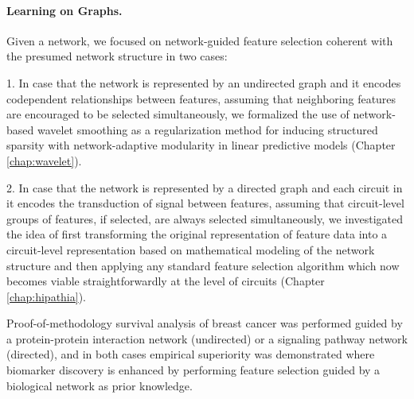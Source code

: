 \paragraph{Learning on Graphs.}

Given a network, we focused on network-guided feature selection coherent with the presumed network structure in two cases:
\begin{bulletList}
\item[1.] In case that the network is represented by an undirected graph and it encodes codependent relationships between features, assuming that neighboring features are encouraged to be selected simultaneously, we formalized the use of network-based wavelet smoothing as a regularization method for inducing structured sparsity with network-adaptive modularity in linear predictive models (Chapter \ref{chap:wavelet}).
\item[2.] In case that the network is represented by a directed graph and each circuit in it encodes the transduction of signal between features, assuming that circuit-level groups of features, if selected, are always selected simultaneously, we investigated the idea of first transforming the original representation of feature data into a circuit-level representation based on mathematical modeling of the network structure and then applying any standard feature selection algorithm which now becomes viable straightforwardly at the level of circuits (Chapter \ref{chap:hipathia}).
\end{bulletList}
Proof-of-methodology survival analysis of breast cancer was performed guided by a protein-protein interaction network (undirected) or a signaling pathway network (directed), and in both cases empirical superiority was demonstrated where biomarker discovery is enhanced by performing feature selection guided by a biological network as prior knowledge.


